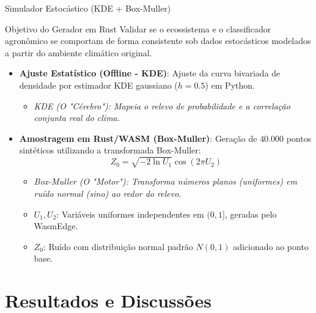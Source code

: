 \documentclass[aspectratio=169]{beamer}
\begin{document}
\begin{frame}{Simulador Estocástico (KDE + Box-Muller)}
  \begin{block}{Objetivo do Gerador em Rust}
    Validar se o ecossistema e o classificador agronômico se comportam de forma consistente sob dados estocásticos modelados a partir do ambiente climático original.
  \end{block}
  \vspace{0.1cm}
  \begin{itemize}
    \item \textbf{Ajuste Estatístico (Offline - KDE)}: Ajuste da curva bivariada de densidade por estimador KDE gaussiano ($h=0.5$) em Python.
      \begin{itemize}
        \item \small \textit{KDE (O "Cérebro"): Mapeia o relevo de probabilidade e a correlação conjunta real do clima.}
      \end{itemize}
    \item \textbf{Amostragem em Rust/WASM (Box-Muller)}: Geração de $40.000$ pontos sintéticos utilizando a transformada Box-Muller:
      \[Z_0 = \sqrt{-2\ln U_1}\cos(2\pi U_2)\]
      \begin{itemize}
        \item \small \textit{Box-Muller (O "Motor"): Transforma números planos (uniformes) em ruído normal (sino) ao redor do relevo.}
        \item \small $U_1, U_2$: Variáveis uniformes independentes em $(0, 1]$, geradas pelo WasmEdge.
        \item \small $Z_0$: Ruído com distribuição normal padrão $N(0, 1)$ adicionado ao ponto base.
      \end{itemize}
  \end{itemize}
\end{frame}

\section{Resultados e Discussões}
\end{document}
